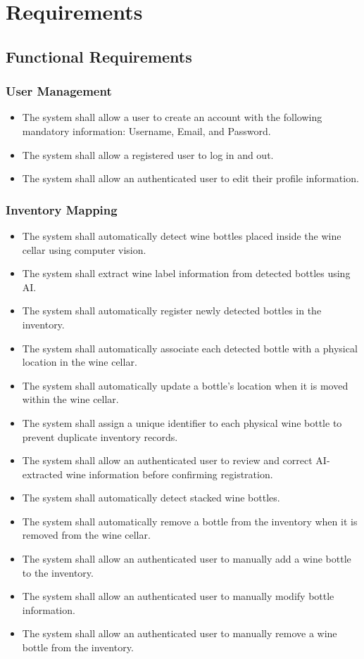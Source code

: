 \documentclass[conference]{IEEEtran}
\begin{document}
\section{Requirements}

\subsection{Functional Requirements}

\subsubsection{User Management}
\begin{itemize}
    \item The system shall allow a user to create an account with the following mandatory information: Username, Email, and Password.
    \item The system shall allow a registered user to log in and out.
    \item The system shall allow an authenticated user to edit their profile information.
\end{itemize}

\subsubsection{Inventory Mapping}
\begin{itemize}
    \item The system shall automatically detect wine bottles placed inside the wine cellar using computer vision.
    \item The system shall extract wine label information from detected bottles using AI.
    \item The system shall automatically register newly detected bottles in the inventory.
    \item The system shall automatically associate each detected bottle with a physical location in the wine cellar.
    \item The system shall automatically update a bottle's location when it is moved within the wine cellar.
    \item The system shall assign a unique identifier to each physical wine bottle to prevent duplicate inventory records.
    \item The system shall allow an authenticated user to review and correct AI-extracted wine information before confirming registration.
    \item The system shall automatically detect stacked wine bottles.
    \item The system shall automatically remove a bottle from the inventory when it is removed from the wine cellar.
    \item The system shall allow an authenticated user to manually add a wine bottle to the inventory.
    \item The system shall allow an authenticated user to manually modify bottle information.
    \item The system shall allow an authenticated user to manually remove a wine bottle from the inventory.
\end{itemize}
\end{document}
